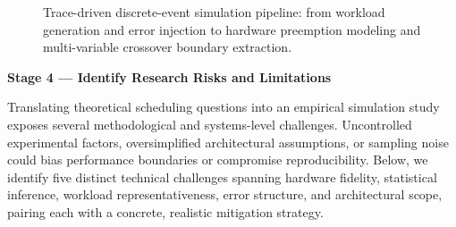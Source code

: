 \documentclass[11pt]{article}
\newcommand{\topicTitle}[1]{
    \vspace{0.35em}\noindent{\fontsize{11}{13.2}\selectfont \textbf{#1}}\par\vspace{0.2em}
}
\begin{document}
\begin{figure}[!ht]
\caption{Trace-driven discrete-event simulation pipeline: from workload generation and error injection to hardware preemption modeling and multi-variable crossover boundary extraction.}\label{fig:deliverable3_pipeline}
\end{figure}

\newpage
{\centering\fontsize{13}{16}\selectfont\textbf{Stage 4 --- Identify Research Risks and Limitations}\par}
\vspace{0.3em}

\topicTitle{Task E: Feasibility and Limitations}

Translating theoretical scheduling questions into an empirical simulation study exposes several methodological and systems-level challenges. Uncontrolled experimental factors, oversimplified architectural assumptions, or sampling noise could bias performance boundaries or compromise reproducibility. Below, we identify five distinct technical challenges spanning hardware fidelity, statistical inference, workload representativeness, error structure, and architectural scope, pairing each with a concrete, realistic mitigation strategy.
\end{document}
